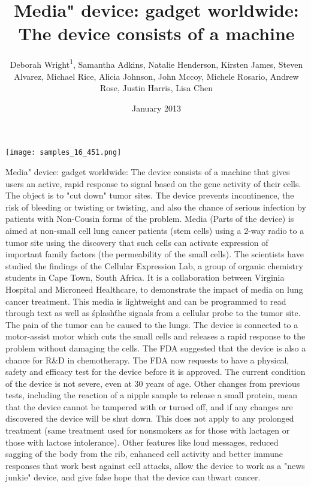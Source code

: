 \documentclass{article}
\title{\'Media" device: gadget worldwide: The device consists of a machine}
\author{Deborah Wright\textsuperscript{1},  Samantha Adkins,  Natalie Henderson,  Kirsten James,  Steven Alvarez,  Michael Rice,  Alicia Johnson,  John Mccoy,  Michele Rosario,  Andrew Rose,  Justin Harris,  Lisa Chen}
\affil{\textsuperscript{1}The Chinese University of Hong Kong (Shenzhen)}
\date{January 2013}
\begin{document}
\maketitle

\begin{center}
\begin{minipage}{0.75\linewidth}
\texttt{[image: samples\_16\_451.png]}
\end{minipage}
\end{center}

\'Media" device: gadget worldwide: The device consists of a machine that gives users an active, rapid response to signal based on the gene activity of their cells. The object is to "cut down" tumor sites. The device prevents incontinence, the risk of bleeding or twisting or twisting, and also the chance of serious infection by patients with Non-Cousin forms of the problem. Media (Parts of the device) is aimed at non-small cell lung cancer patients (stem cells) using a 2-way radio to a tumor site using the discovery that such cells can activate expression of important family factors (the permeability of the small cells). The scientists have studied the findings of the Cellular Expression Lab, a group of organic chemistry students in Cape Town, South Africa. It is a collaboration between Virginia Hospital and Microneed Healthcare, to demonstrate the impact of media on lung cancer treatment. This media is lightweight and can be programmed to read through text as well as \'splash\' the signals from a cellular probe to the tumor site. The pain of the tumor can be caused to the lungs. The device is connected to a motor-assist motor which cuts the small cells and releases a rapid response to the problem without damaging the cells. The FDA suggested that the device is also a chance for R\&D in chemotherapy. The FDA now requests to have a physical, safety and efficacy test for the device before it is approved. The current condition of the device is not severe, even at 30 years of age. Other changes from previous tests, including the reaction of a nipple sample to release a small protein, mean that the device cannot be tampered with or turned off, and if any changes are discovered the device will be shut down. This does not apply to any prolonged treatment (same treatment used for nonsmokers as for those with lactagen or those with lactose intolerance). Other features like loud messages, reduced sagging of the body from the rib, enhanced cell activity and better immune responses that work best against cell attacks, allow the device to work as a "news junkie" device, and give false hope that the device can thwart cancer.
\end{document}
